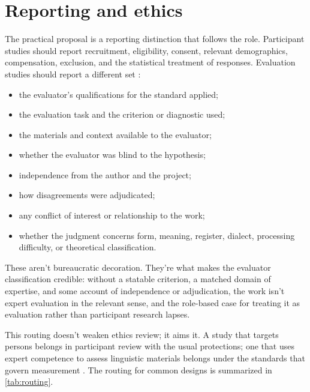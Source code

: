 \section{Reporting and ethics}
\label{sec:reporting-ethics}

The practical proposal is a reporting distinction that follows the role. Participant studies should report recruitment, eligibility, consent, relevant demographics, compensation, exclusion, and the statistical treatment of responses. Evaluation studies should report a different set \citep{aera2014standards}:

\begin{itemize}
  \item the evaluator's qualifications for the standard applied;
  \item the evaluation task and the criterion or diagnostic used;
  \item the materials and context available to the evaluator;
  \item whether the evaluator was blind to the hypothesis;
  \item independence from the author and the project;
  \item how disagreements were adjudicated;
  \item any conflict of interest or relationship to the work;
  \item whether the judgment concerns form, meaning, register, dialect, processing difficulty, or theoretical classification.
\end{itemize}

These aren't bureaucratic decoration. They're what makes the evaluator classification credible: without a statable criterion, a matched domain of expertise, and some account of independence or adjudication, the work isn't expert evaluation in the relevant sense, and the role-based case for treating it as evaluation rather than participant research lapses.

This routing doesn't weaken ethics review; it aims it. A study that targets persons belongs in participant review with the usual protections; one that uses expert competence to assess linguistic materials belongs under the standards that govern measurement \citep{aera2014standards}. The routing for common designs is summarized in \autoref{tab:routing}.

